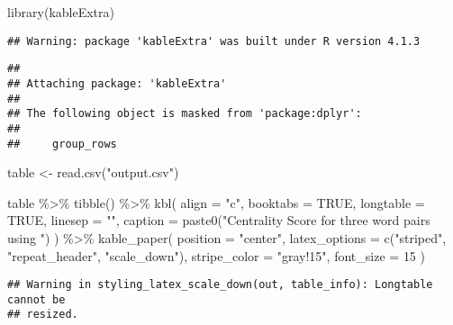 \documentclass[
]{article}
\newenvironment{Shaded}{\begin{snugshade}}{\end{snugshade}}
\newcommand{\AttributeTok}[1]{\textcolor[rgb]{0.77,0.63,0.00}{#1}}
\newcommand{\ConstantTok}[1]{\textcolor[rgb]{0.00,0.00,0.00}{#1}}
\newcommand{\DecValTok}[1]{\textcolor[rgb]{0.00,0.00,0.81}{#1}}
\newcommand{\FunctionTok}[1]{\textcolor[rgb]{0.00,0.00,0.00}{#1}}
\newcommand{\NormalTok}[1]{#1}
\newcommand{\OtherTok}[1]{\textcolor[rgb]{0.56,0.35,0.01}{#1}}
\newcommand{\SpecialCharTok}[1]{\textcolor[rgb]{0.00,0.00,0.00}{#1}}
\newcommand{\StringTok}[1]{\textcolor[rgb]{0.31,0.60,0.02}{#1}}
\begin{document}
\begin{Shaded}
\begin{Highlighting}[]
\FunctionTok{library}\NormalTok{(kableExtra)}
\end{Highlighting}
\end{Shaded}

\begin{verbatim}
## Warning: package 'kableExtra' was built under R version 4.1.3
\end{verbatim}

\begin{verbatim}
## 
## Attaching package: 'kableExtra'
## 
## The following object is masked from 'package:dplyr':
## 
##     group_rows
\end{verbatim}

\begin{Shaded}
\begin{Highlighting}[]
\NormalTok{table }\OtherTok{\textless{}{-}} \FunctionTok{read.csv}\NormalTok{(}\StringTok{"output.csv"}\NormalTok{)}

\NormalTok{table }\SpecialCharTok{\%\textgreater{}\%} \FunctionTok{tibble}\NormalTok{() }\SpecialCharTok{\%\textgreater{}\%}
      \FunctionTok{kbl}\NormalTok{(}
      \AttributeTok{align =} \StringTok{"c"}\NormalTok{,}
      \AttributeTok{booktabs =} \ConstantTok{TRUE}\NormalTok{,}
      \AttributeTok{longtable =} \ConstantTok{TRUE}\NormalTok{,}
      \AttributeTok{linesep =} \StringTok{""}\NormalTok{,}
      \AttributeTok{caption =} \FunctionTok{paste0}\NormalTok{(}\StringTok{"Centrality Score for three word pairs using "}\NormalTok{)}
\NormalTok{      ) }\SpecialCharTok{\%\textgreater{}\%}
  \FunctionTok{kable\_paper}\NormalTok{(}
        \AttributeTok{position =} \StringTok{"center"}\NormalTok{,}
        \AttributeTok{latex\_options =} \FunctionTok{c}\NormalTok{(}\StringTok{"striped"}\NormalTok{, }\StringTok{"repeat\_header"}\NormalTok{, }\StringTok{"scale\_down"}\NormalTok{),}
        \AttributeTok{stripe\_color =} \StringTok{"gray!15"}\NormalTok{,}
        \AttributeTok{font\_size =} \DecValTok{15}
\NormalTok{    )}
\end{Highlighting}
\end{Shaded}

\begin{verbatim}
## Warning in styling_latex_scale_down(out, table_info): Longtable cannot be
## resized.
\end{verbatim}

\begingroup\fontsize{15}{17}\selectfont
\end{document}
